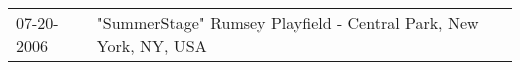\begin{supertabular}{ll}
 07-20-2006 &  "SummerStage" Rumsey Playfield - Central Park, New York, NY, USA \\
\end{supertabular}
